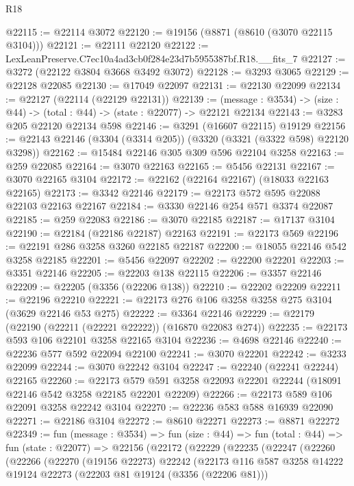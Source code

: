 \begin{lexlean}{R18}
\begin{coremodule}
@22115 := @22114 @3072
@22120 := @19156 (@8871 (@8610 (@3070 @22115 @3104)))
@22121 := @22111 @22120
@22122 := LexLeanPreserve.C7ec10a4ad3cb0f284e23d7b5955387bf.R18.__fits_7
@22127 := @3272 (@22122 @3804 @3668 @3492 @3072)
@22128 := @3293 @3065
@22129 := @22128 @22085
@22130 := @17049 @22097
@22131 := @22130 @22099
@22134 := @22127 (@22114 (@22129 @22131))
@22139 := (message : @3534) -> (size : @44) -> (total : @44) -> (state : @22077) -> @22121 @22134
@22143 := @3283 @205 @22120 @22134 @598
@22146 := @3291 (@16607 @22115) @19129
@22156 := @22143 @22146 (@3304 (@3314 @205)) (@3320 (@3321 (@3322 @598) @22120 @3298))
@22162 := @15484 @22146 @305 @309 @596 @22104 @3258
@22163 := @259 @22085
@22164 := @3070 @22163
@22165 := @5456 @22131
@22167 := @3070 @22165 @3104
@22172 := @22162 (@22164 @22167) (@18033 @22163 @22165)
@22173 := @3342 @22146
@22179 := @22173 @572 @595 @22088 @22103 @22163 @22167
@22184 := @3330 @22146 @254 @571 @3374 @22087
@22185 := @259 @22083
@22186 := @3070 @22185
@22187 := @17137 @3104
@22190 := @22184 (@22186 @22187) @22163
@22191 := @22173 @569
@22196 := @22191 @286 @3258 @3260 @22185 @22187
@22200 := @18055 @22146 @542 @3258 @22185
@22201 := @5456 @22097
@22202 := @22200 @22201
@22203 := @3351 @22146
@22205 := @22203 @138 @22115
@22206 := @3357 @22146
@22209 := @22205 (@3356 (@22206 @138))
@22210 := @22202 @22209
@22211 := @22196 @22210
@22221 := @22173 @276 @106 @3258 @3258 @275 @3104 (@3629 @22146 @53 @275)
@22222 := @3364 @22146
@22229 := @22179 (@22190 (@22211 (@22221 @22222)) (@16870 @22083 @274))
@22235 := @22173 @593 @106 @22101 @3258 @22165 @3104
@22236 := @4698 @22146
@22240 := @22236 @577 @592 @22094 @22100
@22241 := @3070 @22201
@22242 := @3233 @22099
@22244 := @3070 @22242 @3104
@22247 := @22240 (@22241 @22244) @22165
@22260 := @22173
    @579
    @591
    @3258
    @22093
    @22201
    @22244
    (@18091 @22146 @542 @3258 @22185 @22201 @22209)
@22266 := @22173 @589 @106 @22091 @3258 @22242 @3104
@22270 := @22236 @583 @588 @16939 @22090
@22271 := @22186 @3104
@22272 := @8610 @22271
@22273 := @8871 @22272
@22349 := fun (message : @3534) =>
  fun (size : @44) =>
  fun (total : @44) =>
  fun (state : @22077) =>
  @22156
    (@22172
      (@22229
        (@22235
          (@22247
            (@22260
              (@22266
                (@22270
                  (@19156 @22273)
                  @22242
                  (@22173
                    @116
                    @587
                    @3258
                    @14222
                    @19124
                    @22273
                    (@22203 @81 @19124 (@3356 (@22206 @81)))

\end{coremodule}
\end{lexlean}
